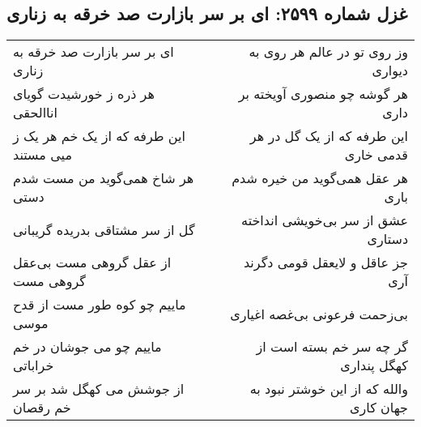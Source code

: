 \begin{center}
\section*{غزل شماره ۲۵۹۹: ای بر سر بازارت صد خرقه به زناری}
\label{sec:2599}
\begin{longtable}{l p{0.5cm} r}
ای بر سر بازارت صد خرقه به زناری
&&
وز روی تو در عالم هر روی به دیواری
\\
هر ذره ز خورشیدت گویای اناالحقی
&&
هر گوشه چو منصوری آویخته بر داری
\\
این طرفه که از یک خم هر یک ز میی مستند
&&
این طرفه که از یک گل در هر قدمی خاری
\\
هر شاخ همی‌گوید من مست شدم دستی
&&
هر عقل همی‌گوید من خیره شدم باری
\\
گل از سر مشتاقی بدریده گریبانی
&&
عشق از سر بی‌خویشی انداخته دستاری
\\
از عقل گروهی مست بی‌عقل گروهی مست
&&
جز عاقل و لایعقل قومی دگرند آری
\\
ماییم چو کوه طور مست از قدح موسی
&&
بی‌زحمت فرعونی بی‌غصه اغیاری
\\
ماییم چو می جوشان در خم خراباتی
&&
گر چه سر خم بسته است از کهگل پنداری
\\
از جوشش می کهگل شد بر سر خم رقصان
&&
والله که از این خوشتر نبود به جهان کاری
\\
\end{longtable}
\end{center}

